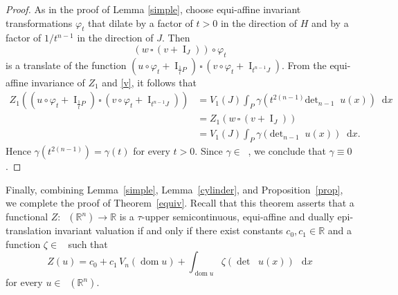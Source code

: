 \documentclass[11pt]{article}
\theoremstyle{definition} %
\newcommand{\dif}{\mathop{}\!\mathrm{d}}
\newcommand{\RR}{(\mathbb{R}^n)}
\DeclareMathOperator{\I}{I}
\DeclareMathOperator{\dom}{dom}
\DeclareMathOperator{\D}{D^2}
\DeclareMathOperator{\LP}{Conv_{lp}}
\DeclareMathOperator{\conc}{Conc([0,\infty))}
\begin{document}
\begin{proof}
As in the proof of Lemma \ref{simple},  choose equi-affine invariant transformations $\varphi_t$ that dilate
by a factor of $t>0$ in the direction of $H$ and by a factor of $1/t^{n-1}$ in the direction of $J$. Then
$$(w\,\square\, (v+\I_{J}))\circ \varphi_t$$
is a translate of the function $(u\circ \varphi_t+ \I_{\frac{1}{t}P})\,\square\, (v\circ\varphi_t+\I_{t^{n-1}J})$. From the equi-affine invariance of $Z_1$ and \eqref{v}, it follows that
\begin{align*}
    Z_1((u\circ \varphi_t+ \I_{\frac{1}{t}P})\,\square\, (v\circ\varphi_t+\I_{t^{n-1}J})) &= V_1(J)\int_{P} \gamma \left(t^{2(n-1)}\mbox{det}_{n-1} \D u( x)\right)\dif x\\
    &= Z_1(w\,\square\, (v+\I_{J}))\\
    &= V_1(J)\int_{P} \gamma \left(\mbox{det}_{n-1} \D u( x)\right)\dif x.   
\end{align*}
Hence $\gamma(t^{2(n-1)})= \gamma(t)$ for every $t>0$. Since $\gamma\in\conc$, we conclude that $\gamma\equiv 0$.
\end{proof}




Finally, combining Lemma~\ref{simple}, Lemma~\ref{cylinder}, and Proposition~\ref{prop}, we complete the proof of Theorem~\ref{equiv}. Recall that this theorem asserts that a functional
\(
Z:\LP\RR\rightarrow\mathbb{R}
\)
is a $\tau$-upper semicontinuous, equi-affine and dually epi-translation invariant valuation if and only if there exist constants $c_0,c_1\in\mathbb{R}$ and a function $\zeta\in\conc$ such that
\[
Z(u)=c_0+c_1\,V_n(\dom u)
+\int_{\dom u}\zeta(\det\D u(x))\,\dif x
\]
for every $u\in\LP\RR$.
\end{document}
